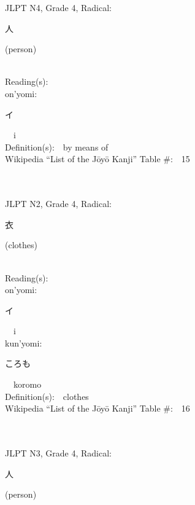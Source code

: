 \begin{multicols}{2}
{JLPT N4, Grade 4, Radical:\ \ {\begin{CJK}{UTF8}{min} 人 \end{CJK}} (person) } \\
Reading(s):\ \ \\
{\hspace*{1em}}on'yomi:\ \ \\
{\hspace*{2em}}{\begin{CJK}{UTF8}{min} イ \end{CJK}}\ \ i\ \ \\
Definition(s):\ \ by means of \\
Wikipedia ``List of the J\=oy\=o Kanji'' Table \#:\ \ 15 \\
\ \ \\
{\fontsize{34pt}{40pt}  }\ \ \\  %
{JLPT N2, Grade 4, Radical:\ \ {\begin{CJK}{UTF8}{min} 衣 \end{CJK}} (clothes) } \\
Reading(s):\ \ \\
{\hspace*{1em}}on'yomi:\ \ \\
{\hspace*{2em}}{\begin{CJK}{UTF8}{min} イ \end{CJK}}\ \ i\ \ \\
{\hspace*{1em}}kun'yomi:\ \ \\
{\hspace*{2em}}{\begin{CJK}{UTF8}{min} ころも \end{CJK}}\ \ koromo\ \ \\
Definition(s):\ \ clothes \\
Wikipedia ``List of the J\=oy\=o Kanji'' Table \#:\ \ 16 \\
\ \ \\
{\fontsize{34pt}{40pt}  }\ \ \\  %
{JLPT N3, Grade 4, Radical:\ \ {\begin{CJK}{UTF8}{min} 人 \end{CJK}} (person) } \\

\end{multicols}

